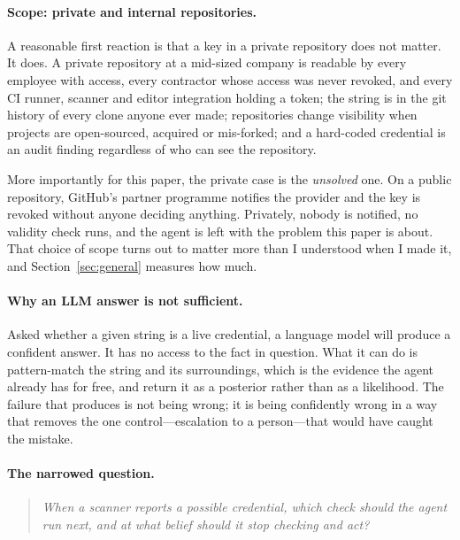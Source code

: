 \documentclass{article}
\begin{document}
\paragraph{Scope: private and internal repositories.}
A reasonable first reaction is that a key in a private repository does not
matter. It does. A private repository at a mid-sized company is readable by every
employee with access, every contractor whose access was never revoked, and every
CI runner, scanner and editor integration holding a token; the string is in the
git history of every clone anyone ever made; repositories change visibility when
projects are open-sourced, acquired or mis-forked; and a hard-coded credential is
an audit finding regardless of who can see the repository.

More importantly for this paper, the private case is the \emph{unsolved} one. On
a public repository, GitHub's partner programme notifies the provider and the key
is revoked without anyone deciding anything. Privately, nobody is notified, no
validity check runs, and the agent is left with the problem this paper is about.
That choice of scope turns out to matter more than I understood when I made it,
and Section~\ref{sec:general} measures how much.

\paragraph{Why an LLM answer is not sufficient.}
Asked whether a given string is a live credential, a language model will produce
a confident answer. It has no access to the fact in question. What it can do is
pattern-match the string and its surroundings, which is the evidence the agent
already has for free, and return it as a posterior rather than as a likelihood.
The failure that produces is not being wrong; it is being confidently wrong in a
way that removes the one control---escalation to a person---that would have
caught the mistake.

\paragraph{The narrowed question.}
\begin{quote}
\emph{When a scanner reports a possible credential, which check should the agent
run next, and at what belief should it stop checking and act?}
\end{quote}
\end{document}
